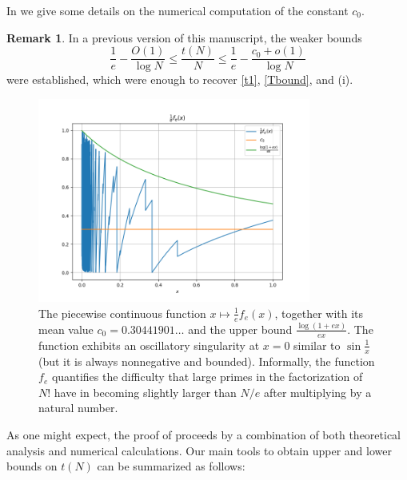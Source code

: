 \documentclass[12pt,a4paper,reqno]{amsart}
\numberwithin{equation}{section}
\theoremstyle{plain}
\theoremstyle{definition}
\newtheorem{remark}[theorem]{Remark}
\begin{document}
In  we give some details on the numerical computation of the constant $c_0$.

\begin{remark}\label{old} In a previous version \cite{tao} of this manuscript, the weaker bounds
  $$ \frac{1}{e} - \frac{O(1)}{\log N} \leq \frac{t(N)}{N} \leq \frac{1}{e} - \frac{c_0+o(1)}{\log N}$$
were established, which were enough to recover \eqref{t1}, \eqref{Tbound}, and (i). 
\end{remark}  

\begin{figure}
  \centering
  \includegraphics[width=0.8\textwidth]{integ.png}
  \caption{The piecewise continuous function $x\mapsto \frac{1}{e} f_e(x)$, together with its mean value $c_0 = 0.30441901\dots$ and the upper bound $\frac{\log(1+ex)}{ex}$.  The function exhibits an oscillatory singularity at $x=0$ similar to $\sin \frac{1}{x}$ (but it is always nonnegative and bounded). Informally, the function $f_e$ quantifies the difficulty that large primes in the factorization of $N!$ have in becoming slightly larger than $N/e$ after multiplying by a natural number.}\label{fig-mean}
\end{figure}

As one might expect, the proof of  proceeds by a combination of both theoretical analysis and numerical calculations.  Our main tools to obtain upper and lower bounds on $t(N)$ can be summarized as follows:
\end{document}

